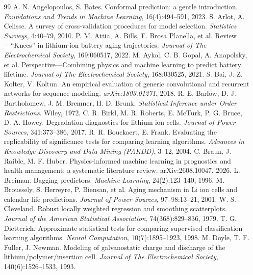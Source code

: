 \documentclass[12pt,a4paper,oneside]{report}
\theoremstyle{plain}
\theoremstyle{definition}
\begin{document}
\begin{thebibliography}{99}\small\setlength{\itemsep}{0pt}\setlength{\parsep}{0pt}
 A. N. Angelopoulos, S. Bates. Conformal prediction: a gentle introduction.
  \emph{Foundations and Trends in Machine Learning}, 16(4):494--591, 2023.
 S. Arlot, A. Celisse. A survey of cross-validation procedures for model selection.
  \emph{Statistics Surveys}, 4:40--79, 2010.
 P. M. Attia, A. Bills, F. Brosa Planella, et al. Review---“Knees” in lithium-ion battery
  aging trajectories. \emph{Journal of The Electrochemical Society}, 169:060517, 2022.
 M. Aykol, C. B. Gopal, A. Anapolsky, et al. Perspective---Combining physics and machine
  learning to predict battery lifetime. \emph{Journal of The Electrochemical Society}, 168:030525, 2021.
 S. Bai, J. Z. Kolter, V. Koltun. An empirical evaluation of generic convolutional and recurrent
  networks for sequence modeling. \emph{arXiv:1803.01271}, 2018.
 R. E. Barlow, D. J. Bartholomew, J. M. Bremner, H. D. Brunk. \emph{Statistical Inference under
  Order Restrictions}. Wiley, 1972.
 C. R. Birkl, M. R. Roberts, E. McTurk, P. G. Bruce, D. A. Howey. Degradation diagnostics for
  lithium ion cells. \emph{Journal of Power Sources}, 341:373--386, 2017.
 R. R. Bouckaert, E. Frank. Evaluating the replicability of significance tests for comparing
  learning algorithms. \emph{Advances in Knowledge Discovery and Data Mining (PAKDD)}, 3--12, 2004.
 C. Braun, J. Raible, M. F. Huber. Physics-informed machine learning in prognostics and health
  management: a systematic literature review. arXiv:2608.10047, 2026.
 L. Breiman. Bagging predictors. \emph{Machine Learning}, 24(2):123--140, 1996.
 M. Broussely, S. Herreyre, P. Biensan, et al. Aging mechanism in Li ion cells and calendar
  life predictions. \emph{Journal of Power Sources}, 97--98:13--21, 2001.
 W. S. Cleveland. Robust locally weighted regression and smoothing scatterplots.
  \emph{Journal of the American Statistical Association}, 74(368):829--836, 1979.
 T. G. Dietterich. Approximate statistical tests for comparing supervised classification
  learning algorithms. \emph{Neural Computation}, 10(7):1895--1923, 1998.
 M. Doyle, T. F. Fuller, J. Newman. Modeling of galvanostatic charge and discharge of the
  lithium/polymer/insertion cell. \emph{Journal of The Electrochemical Society}, 140(6):1526--1533, 1993.

\end{thebibliography}
\end{document}
